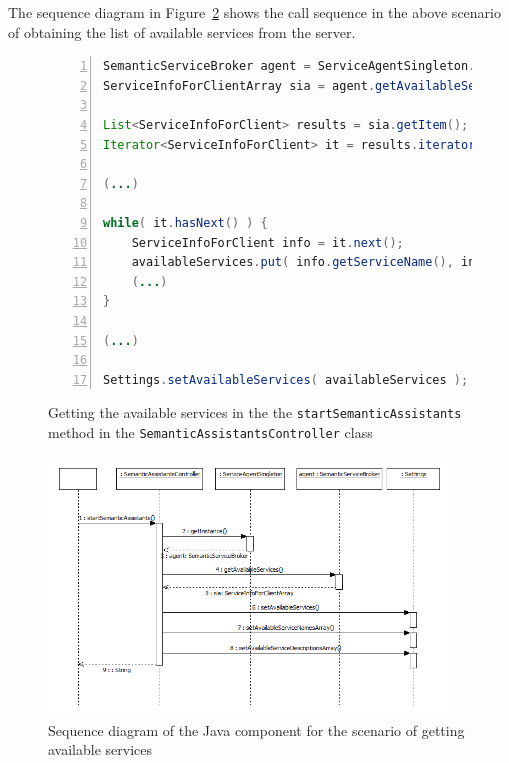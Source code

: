 The sequence diagram in Figure~\ref{fig:mozilla_development_notes_java_component_sequence_diagram_get_available_services} shows the call sequence in the above scenario of obtaining the list of available services from the server. 

\begin{figure}
\centering
\begin{lstlisting}[language=Java,numbers=left,xleftmargin=4mm,columns=flexible]
SemanticServiceBroker agent = ServiceAgentSingleton.getInstance();
ServiceInfoForClientArray sia = agent.getAvailableServices();

List<ServiceInfoForClient> results = sia.getItem();
Iterator<ServiceInfoForClient> it = results.iterator();

(...)

while( it.hasNext() ) {
    ServiceInfoForClient info = it.next();
    availableServices.put( info.getServiceName(), info );
    (...)
}

(...)

Settings.setAvailableServices( availableServices );
\end{lstlisting}
\caption{Getting the available services in the the \texttt{startSemanticAssistants} method in the \texttt{SemanticAssistantsController} class}
\label{list:mozilla_development_notes_java_component_get_available_services}
\end{figure}

\begin{figure}[htb]
  \centering
  \includegraphics[width=0.95\textwidth]{pictures/mozilla_development_notes_java_component_sequence_diagram_get_available_services.png}
  \caption{Sequence diagram of the Java component for the scenario of getting available services}
  \label{fig:mozilla_development_notes_java_component_sequence_diagram_get_available_services}
\end{figure}

